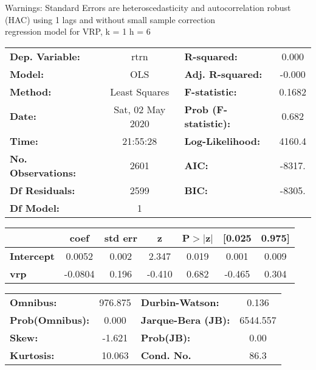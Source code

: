 Warnings: \newline
 [1] Standard Errors are heteroscedasticity and autocorrelation robust (HAC) using 1 lags and without small sample correction\\ 

regression model for VRP, k = 1 h = 6\begin{center}
\begin{tabular}{lclc}
\toprule
\textbf{Dep. Variable:}    &       rtrn       & \textbf{  R-squared:         } &     0.000   \\
\textbf{Model:}            &       OLS        & \textbf{  Adj. R-squared:    } &    -0.000   \\
\textbf{Method:}           &  Least Squares   & \textbf{  F-statistic:       } &    0.1682   \\
\textbf{Date:}             & Sat, 02 May 2020 & \textbf{  Prob (F-statistic):} &    0.682    \\
\textbf{Time:}             &     21:55:28     & \textbf{  Log-Likelihood:    } &    4160.4   \\
\textbf{No. Observations:} &        2601      & \textbf{  AIC:               } &    -8317.   \\
\textbf{Df Residuals:}     &        2599      & \textbf{  BIC:               } &    -8305.   \\
\textbf{Df Model:}         &           1      & \textbf{                     } &             \\
\bottomrule
\end{tabular}
\begin{tabular}{lcccccc}
                   & \textbf{coef} & \textbf{std err} & \textbf{z} & \textbf{P$> |$z$|$} & \textbf{[0.025} & \textbf{0.975]}  \\
\midrule
\textbf{Intercept} &       0.0052  &        0.002     &     2.347  &         0.019        &        0.001    &        0.009     \\
\textbf{vrp}       &      -0.0804  &        0.196     &    -0.410  &         0.682        &       -0.465    &        0.304     \\
\bottomrule
\end{tabular}
\begin{tabular}{lclc}
\textbf{Omnibus:}       & 976.875 & \textbf{  Durbin-Watson:     } &    0.136  \\
\textbf{Prob(Omnibus):} &   0.000 & \textbf{  Jarque-Bera (JB):  } & 6544.557  \\
\textbf{Skew:}          &  -1.621 & \textbf{  Prob(JB):          } &     0.00  \\
\textbf{Kurtosis:}      &  10.063 & \textbf{  Cond. No.          } &     86.3  \\
\bottomrule
\end{tabular}
\end{center}

